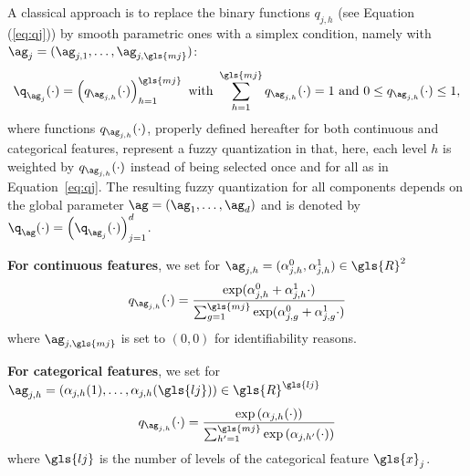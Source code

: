 A classical approach is to replace the binary functions $q_{j,h}$ (see Equation (\ref{eq:qj}))  by smooth parametric ones  with a simplex condition, namely with $\ag_j=(\ag_{j,1},\ldots, \ag_{j,\gls{mj}})$:
\begin{equation*}
    {\q_{\ag_j}(\cdot)=\left(q_{\ag_{j,h}}(\cdot)\right)_{h=1}^{\gls{mj}} \text{ with } \sum_{h=1}^{\gls{mj}}q_{\ag_{j,h}}(\cdot)=1 \text{ and } 0 \leq q_{\ag_{j,h}}(\cdot) \leq 1,}
\end{equation*}
where functions $q_{\ag_{j,h}}(\cdot)$, properly defined hereafter for both continuous and categorical features, represent a fuzzy quantization in that, here, each level $h$ is weighted by $q_{\ag_{j,h}}(\cdot)$ instead of being selected once and for all as in Equation~\eqref{eq:qj}. The resulting fuzzy quantization for all components depends on the global parameter $\ag = (\ag_1, \ldots, \ag_d)$ and is denoted by $\q_{\ag}(\cdot)=\left(\q_{\ag_j}(\cdot)\right)_{j=1}^d$. 




 {\bf For continuous features}, we set for $\ag_{j,h} = (\alpha^0_{j,h},\alpha^1_{j,h}) \in \gls{R}^2$
\begin{equation} \label{eq:softmax}
q_{\ag_{j,h}}(\cdot) = \frac{\exp(\alpha^0_{j,h} + \alpha^1_{j,h}  \cdot)}{\sum_{g=1}^{\gls{mj}} \exp(\alpha^0_{j,g} + \alpha^1_{j,g}  \cdot)}
\end{equation}
where $\ag_{j,\gls{mj}}$ is set to $(0,0)$ for identifiability reasons.




{\bf For categorical features}, we set for $\ag_{j,h}=\left(\alpha_{j,h}(1),\ldots, \alpha_{j,h}(\gls{lj})\right) \in \gls{R}^{\gls{lj}}$
\[q_{\ag_{j,h}}(\cdot) = \frac{\exp\left(\alpha_{j,h}(\cdot)\right)}{\sum_{h'=1}^{\gls{mj}} \exp\left(\alpha_{j,h'}(\cdot)\right)}\]
where $\gls{lj}$ is the number of levels of the categorical feature $\gls{x}_j$.



